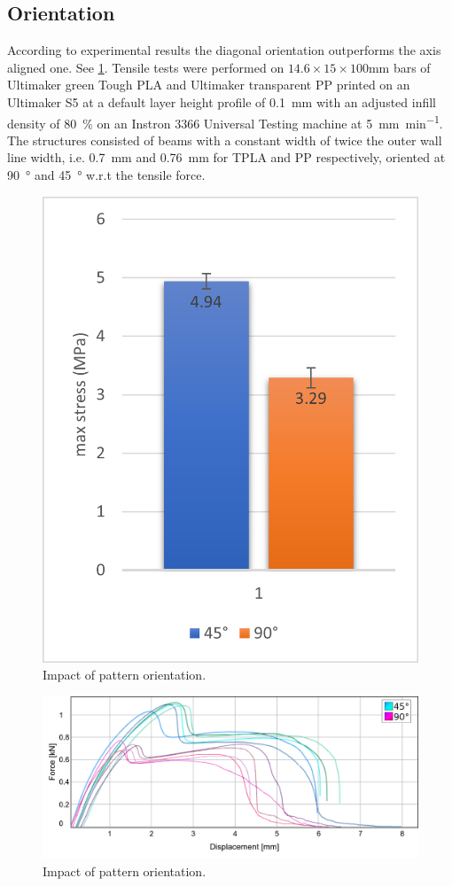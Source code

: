 \subsection{Orientation}
According to experimental results the diagonal orientation outperforms the axis aligned one.
See \cref{graph:45vs90}.
Tensile tests were performed on $14.6\times15\times100$\si{\milli\meter} bars of Ultimaker green Tough PLA and Ultimaker transparent PP
printed on an Ultimaker S5 at a default layer height profile of \SI{0.1}{\milli\meter} with an adjusted infill density of \SI{80}{\percent}
on an Instron 3366 Universal Testing machine at \SI{5}{\milli\meter\per\minute}.
The structures consisted of beams with a constant width of twice the outer wall line width, i.e. \SI{0.7}{\milli\meter} and \SI{0.76}{\milli\meter} for TPLA and PP respectively,
oriented at \SI{90}{\degree} and \SI{45}{\degree} w.r.t the tensile force.

\begin{figure}
	\centering
	\includegraphics[width=.5\columnwidth]{sources/testing/45vs90.png}
	\caption{Impact of pattern orientation.}
	\label{graph:45vs90}
\end{figure}


\begin{figure}
	\centering
	\includegraphics[width=\columnwidth]{sources/testing/45vs90_stress_strain.png}
	\caption{Impact of pattern orientation.}
	\label{graph:45vs90_stress_strain}
\end{figure}
